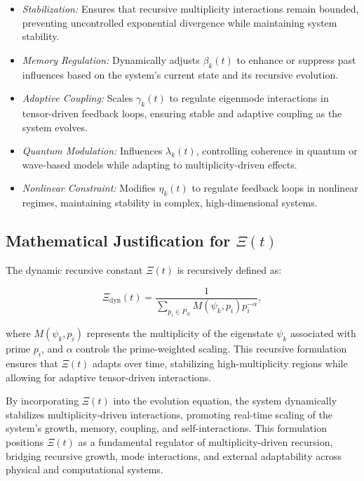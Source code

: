 \documentclass{article}
\theoremstyle{plain}
\begin{document}
\begin{itemize}
    \item \textit{Stabilization:} Ensures that recursive multiplicity interactions remain bounded, preventing uncontrolled exponential divergence while maintaining system stability.
    \item \textit{Memory Regulation:} Dynamically adjusts \( \beta_k(t) \) to enhance or suppress past influences based on the system's current state and its recursive evolution.
    \item \textit{Adaptive Coupling:} Scales \( \gamma_k(t) \) to regulate eigenmode interactions in tensor-driven feedback loops, ensuring stable and adaptive coupling as the system evolves.
    \item \textit{Quantum Modulation:} Influences \( \lambda_k(t) \), controlling coherence in quantum or wave-based models while adapting to multiplicity-driven effects.
    \item \textit{Nonlinear Constraint:} Modifies \( \eta_k(t) \) to regulate feedback loops in nonlinear regimes, maintaining stability in complex, high-dimensional systems.
\end{itemize}

\subsection{Mathematical Justification for \(\Xi(t) \)}

The dynamic recursive constant \(\Xi(t) \) is recursively defined as:

\begin{equation}
\Xi_{\text{dyn}}(t) = \frac{1}{\sum_{p_i \in P_N} M(\psi_k, p_i) p_i^{-\alpha}},
\end{equation}

where \( M(\psi_k, p_i) \) represents the multiplicity of the eigenstate \( \psi_k \) associated with prime \( p_i \), and \( \alpha \) controls the prime-weighted scaling. This recursive formulation ensures that \(\Xi(t) \) adapts over time, stabilizing high-multiplicity regions while allowing for adaptive tensor-driven interactions.

By incorporating \(\Xi(t) \) into the evolution equation, the system dynamically stabilizes multiplicity-driven interactions, promoting real-time scaling of the system's growth, memory, coupling, and self-interactions. This formulation positions \(\Xi(t) \) as a fundamental regulator of multiplicity-driven recursion, bridging recursive growth, mode interactions, and external adaptability across physical and computational systems.
\end{document}
